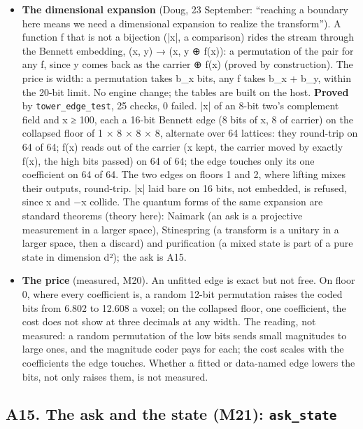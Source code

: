 \begin{itemize}
\item \textbf{The dimensional expansion} (Doug, 23 September: “reaching a boundary here means we need a dimensional expansion to realize the transform”). A function f that is not a bijection (|x|, a comparison) rides the stream through the Bennett embedding, (x, y) → (x, y ⊕ f(x)): a permutation of the pair for any f, since y comes back as the carrier ⊕ f(x) (proved by construction). The price is width: a permutation takes b\_\allowbreak{}x bits, any f takes b\_\allowbreak{}x + b\_\allowbreak{}y, within the 20-bit limit. No engine change; the tables are built on the host. \textbf{Proved} by \texttt{tower\_\allowbreak{}edge\_\allowbreak{}test}, 25 checks, 0 failed. |x| of an 8-bit two's complement field and x ≥ 100, each a 16-bit Bennett edge (8 bits of x, 8 of carrier) on the collapsed floor of 1 × 8 × 8 × 8, alternate over 64 lattices: they round-trip on 64 of 64; f(x) reads out of the carrier (x kept, the carrier moved by exactly f(x), the high bits passed) on 64 of 64; the edge touches only its one coefficient on 64 of 64. The two edges on floors 1 and 2, where lifting mixes their outputs, round-trip. |x| laid bare on 16 bits, not embedded, is refused, since x and −x collide. The quantum forms of the same expansion are standard theorems (theory here): Naimark (an ask is a projective measurement in a larger space), Stinespring (a transform is a unitary in a larger space, then a discard) and purification (a mixed state is part of a pure state in dimension d²); the ask is A15.
\item \textbf{The price} (measured, M20). An unfitted edge is exact but not free. On floor 0, where every coefficient is, a random 12-bit permutation raises the coded bits from 6.802 to 12.608 a voxel; on the collapsed floor, one coefficient, the cost does not show at three decimals at any width. The reading, not measured: a random permutation of the low bits sends small magnitudes to large ones, and the magnitude coder pays for each; the cost scales with the coefficients the edge touches. Whether a fitted or data-named edge lowers the bits, not only raises them, is not measured.
\end{itemize}

\subsection{\texorpdfstring{A15. The ask and the state (M21): \texttt{ask\_\allowbreak{}state}}{A15. The ask and the state (M21): ask\_state}}

